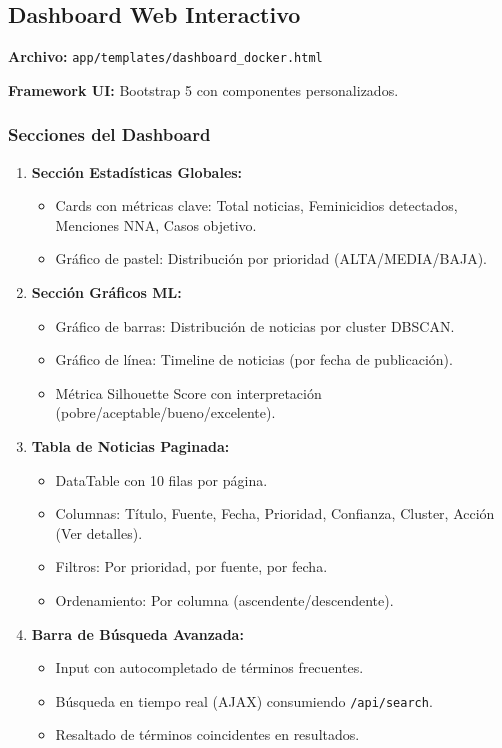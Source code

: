 \subsection{Dashboard Web Interactivo}
\label{subsec:dashboard}

\textbf{Archivo:} \texttt{app/templates/dashboard\_docker.html}

\textbf{Framework UI:} Bootstrap 5 con componentes personalizados.

\subsubsection{Secciones del Dashboard}

\begin{enumerate}
    \item \textbf{Sección Estadísticas Globales:}
    \begin{itemize}
        \item Cards con métricas clave: Total noticias, Feminicidios detectados, Menciones NNA, Casos objetivo.
        \item Gráfico de pastel: Distribución por prioridad (ALTA/MEDIA/BAJA).
    \end{itemize}
    
    \item \textbf{Sección Gráficos ML:}
    \begin{itemize}
        \item Gráfico de barras: Distribución de noticias por cluster DBSCAN.
        \item Gráfico de línea: Timeline de noticias (por fecha de publicación).
        \item Métrica Silhouette Score con interpretación (pobre/aceptable/bueno/excelente).
    \end{itemize}
    
    \item \textbf{Tabla de Noticias Paginada:}
    \begin{itemize}
        \item DataTable con 10 filas por página.
        \item Columnas: Título, Fuente, Fecha, Prioridad, Confianza, Cluster, Acción (Ver detalles).
        \item Filtros: Por prioridad, por fuente, por fecha.
        \item Ordenamiento: Por columna (ascendente/descendente).
    \end{itemize}
    
    \item \textbf{Barra de Búsqueda Avanzada:}
    \begin{itemize}
        \item Input con autocompletado de términos frecuentes.
        \item Búsqueda en tiempo real (AJAX) consumiendo \texttt{/api/search}.
        \item Resaltado de términos coincidentes en resultados.
    \end{itemize}
\end{enumerate}

